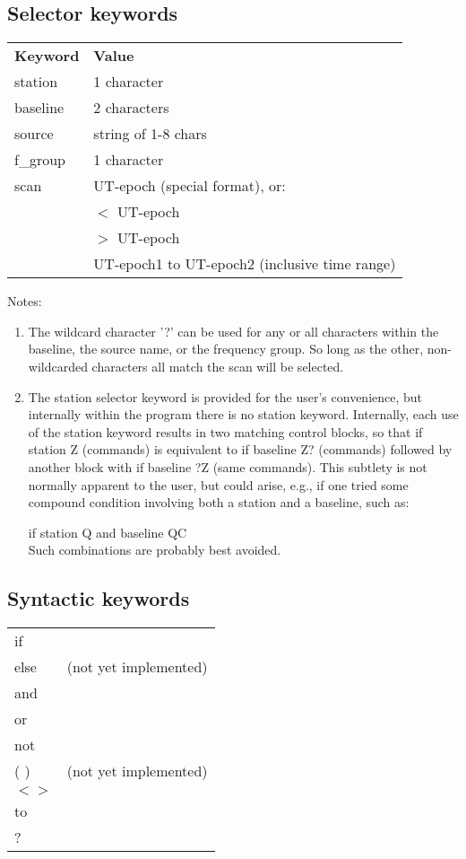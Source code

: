 \subsection{Selector keywords}
\begin{tabular}{ll}
    \textbf{Keyword} & \textbf{Value} \\
    station         &  1 character \\
    baseline        &  2 characters \\
    source          &  string of 1-8 chars \\
    f\_group        &  1 character \\
    scan            &  UT-epoch (special format), or: \\
                    &  $<$ UT-epoch \\
                    &  $>$ UT-epoch \\
                    &  UT-epoch1 to UT-epoch2  (inclusive time range) \\
\end{tabular}
Notes:
\begin{enumerate}

\item The wildcard character '?' can be used for any or all characters
within the baseline, the source name, or the frequency group. So long as
the other, non-wildcarded characters all match the scan will be selected.

\item The station selector keyword is provided for the user's convenience,
but internally within the program there is no station keyword. Internally,
each use of the station keyword results in two matching control blocks,
so that if station Z (commands) is equivalent to if baseline Z? (commands)
followed by another block with if baseline ?Z (same commands). This subtlety 
is not normally apparent to the user, but could arise, e.g., if one tried
some compound condition involving both a station and a baseline, such as:

if station Q and baseline QC \\

Such combinations are probably best avoided.

\end{enumerate}



\subsection{Syntactic keywords}
\begin{tabular}{ll}
   if & \\
   else &   (not yet implemented) \\
   and & \\
   or & \\
   not & \\
   ( )  &    (not yet implemented) \\
   $< >$ & \\
   to & \\
   ? & \\
\end{tabular}

